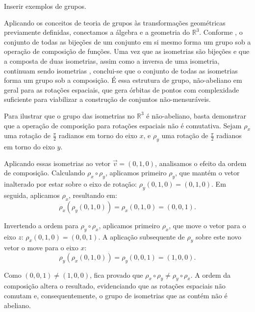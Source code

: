 \begin{exemplo}
    Inserir exemplos de grupos.
\end{exemplo}

Aplicando os conceitos de teoria de grupos às transformações geométricas previamente definidas, conectamos a álgebra e a geometria do \(\mathbb{R}^3\). Conforme \textcite{garcia2014}, o conjunto de todas as bijeções de um conjunto em si mesmo forma um grupo sob a operação de composição de funções. Uma vez que as isometrias são bijeções e que a composta de duas isometrias, assim como a inversa de uma isometria, continuam sendo isometrias \parencite{lima2014}, conclui-se que o conjunto de todas as isometrias forma um grupo sob a composição. É essa estrutura de grupo, não-abeliano em geral para as rotações espaciais, que gera órbitas de pontos com complexidade suficiente para viabilizar a construção de conjuntos não-mensuráveis.

\begin{exemplo}
    \label{ex:rotacoes_nao_comutativas}
    Para ilustrar que o grupo das isometrias no \(\mathbb{R}^3\) é não-abeliano, basta demonstrar que a operação de composição para rotações espaciais não é comutativa. Sejam \(\rho_x\) uma rotação de \(\frac{\pi}{2}\) radianos em torno do eixo \(x\), e \(\rho_y\) uma rotação de \(\frac{\pi}{2}\) radianos em torno do eixo \(y\).

    Aplicando essas isometrias ao vetor \(\vec{v} = (0, 1, 0)\), analisamos o efeito da ordem de composição. Calculando \(\rho_x \circ \rho_y\), aplicamos primeiro \(\rho_y\), que mantém o vetor inalterado por estar sobre o eixo de rotação: \(\rho_y(0, 1, 0) = (0, 1, 0)\). Em seguida, aplicamos \(\rho_x\), resultando em:
    \[
        \rho_x(\rho_y(0, 1, 0)) = \rho_x(0, 1, 0) = (0, 0, 1).
    \]

    Invertendo a ordem para \(\rho_y \circ \rho_x\), aplicamos primeiro \(\rho_x\), que move o vetor para o eixo \(z\): \(\rho_x(0, 1, 0) = (0, 0, 1)\). A aplicação subsequente de \(\rho_y\) sobre este novo vetor o move para o eixo \(x\):
    \[
        \rho_y(\rho_x(0, 1, 0)) = \rho_y(0, 0, 1) = (1, 0, 0).
    \]

    Como \((0, 0, 1) \neq (1, 0, 0)\), fica provado que \(\rho_x \circ \rho_y \neq \rho_y \circ \rho_x\). A ordem da composição altera o resultado, evidenciando que as rotações espaciais não comutam e, consequentemente, o grupo de isometrias que as contém não é abeliano.
\end{exemplo}

